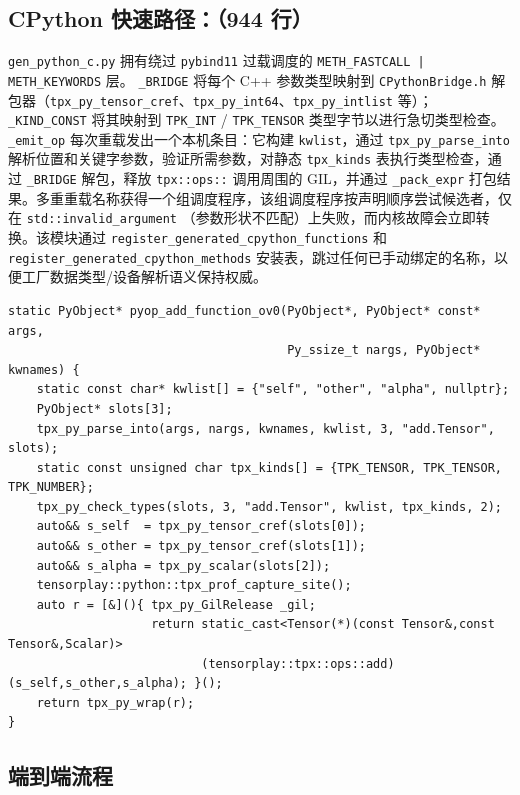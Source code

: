 \subsection{CPython 快速路径：（944 行）}

\texttt{gen\_python\_c.py} 拥有绕过 \texttt{pybind11} 过载调度的 \texttt{METH\_FASTCALL | METH\_KEYWORDS} 层。 \texttt{\_BRIDGE} 将每个 C++ 参数类型映射到 \texttt{CPythonBridge.h} 解包器（\texttt{tpx\_py\_tensor\_cref}、\texttt{tpx\_py\_int64}、\texttt{tpx\_py\_intlist} 等）； \texttt{\_KIND\_CONST} 将其映射到 \texttt{TPK\_INT} / \texttt{TPK\_TENSOR} 类型字节以进行急切类型检查。 \texttt{\_emit\_op} 每次重载发出一个本机条目：它构建 \texttt{kwlist}，通过 \texttt{tpx\_py\_parse\_into} 解析位置和关键字参数，验证所需参数，对静态 \texttt{tpx\_kinds} 表执行类型检查，通过 \texttt{\_BRIDGE} 解包，释放 \texttt{tpx::ops::} 调用周围的 GIL，并通过 \texttt{\_pack\_expr} 打包结果。多重重载名称获得一个组调度程序，该组调度程序按声明顺序尝试候选者，仅在 \texttt{std::invalid\_argument} （参数形状不匹配）上失败，而内核故障会立即转换。该模块通过 \texttt{register\_generated\_cpython\_functions} 和 \texttt{register\_generated\_cpython\_methods} 安装表，跳过任何已手动绑定的名称，以便工厂数据类型/设备解析语义保持权威。

\begin{lstlisting}[caption={per-overload skeleton (abridged, one \texttt{add} overload).}, label=lst:cpythonop, style=cppstyle]
static PyObject* pyop_add_function_ov0(PyObject*, PyObject* const* args,
                                       Py_ssize_t nargs, PyObject* kwnames) {
    static const char* kwlist[] = {"self", "other", "alpha", nullptr};
    PyObject* slots[3];
    tpx_py_parse_into(args, nargs, kwnames, kwlist, 3, "add.Tensor", slots);
    static const unsigned char tpx_kinds[] = {TPK_TENSOR, TPK_TENSOR, TPK_NUMBER};
    tpx_py_check_types(slots, 3, "add.Tensor", kwlist, tpx_kinds, 2);
    auto&& s_self  = tpx_py_tensor_cref(slots[0]);
    auto&& s_other = tpx_py_tensor_cref(slots[1]);
    auto&& s_alpha = tpx_py_scalar(slots[2]);
    tensorplay::python::tpx_prof_capture_site();
    auto r = [&](){ tpx_py_GilRelease _gil;
                    return static_cast<Tensor(*)(const Tensor&,const Tensor&,Scalar)>
                           (tensorplay::tpx::ops::add)(s_self,s_other,s_alpha); }();
    return tpx_py_wrap(r);
}
\end{lstlisting}

\subsection{端到端流程}

